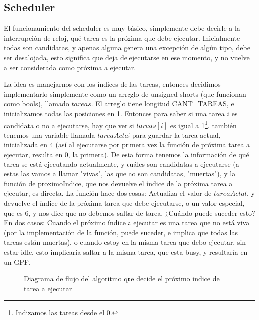 \documentclass[10pt, a4paper]{article}
\begin{document}
\subsection{Scheduler}
El funcionamiento del scheduler es muy básico, simplemente debe decirle a la interrupción de reloj, qué tarea es la próxima que debe ejecutar. Inicialmente todas son candidatas, y apenas alguna genera una excepción de algún tipo, debe ser desalojada, esto significa que deja de ejecutarse en ese momento, y no vuelve a ser considerada como próxima a ejecutar.

La idea es manejarnos con los índices de las tareas, entonces decidimos implementarlo simplemente como un arreglo de unsigned shorts (que funcionan como bools), llamado $tareas$. El arreglo tiene longitud CANT\_TAREAS, e inicializamos todas las posiciones en 1. Entonces para saber si una tarea $i$ es candidata o no a ejecutarse, hay que ver si $tareas[i]$ es igual a 1\footnote{Indizamos las tareas desde el 0.}. también tenemos una variable llamada $tareaActal$ para guardar la tarea actual, inicializada en 4 (así al ejecutarse por primera vez la función de próxima tarea a ejecutar, resulta en 0, la primera). De esta forma tenemos la información de qué tarea se está ejecutando actualmente, y cuáles son candidatas a ejecutarse (a estas las vamos a llamar "vivas", las que no son candidatas, "muertas"), y la función de proximoIndice, que nos devuelve el índice de la próxima tarea a ejecutar, es directa. La función hace dos cosas: Actualiza el valor de $tareaActal$, y devuelve el índice de la próxima tarea que debe ejecutarse, o un valor especial, que es 6, y nos dice que no debemos saltar de tarea. ¿Cuándo puede suceder esto? En dos casos: Cuando el próximo índice a ejecutar es una tarea que no está viva (por la implementación de la función, puede suceder, e implica que todas las tareas están muertas), o cuando estoy en la misma tarea que debo ejecutar, sin estar idle, esto implicaría saltar a la misma tarea, que esta busy, y resultarí­a en un GPF.

	\begin{figure}[H]
  		\centering
		\caption{Diagrama de flujo del algoritmo que decide el próximo indice de tarea a ejecutar}
		\label{fig:proximoIndice}
	\end{figure}
	
\end{document}
